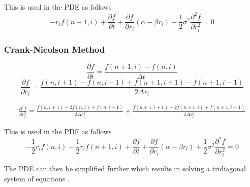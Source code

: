 \documentclass[12pt,a4paper]{article}
\begin{document}
	This is used in the PDE as follows
	$$-r_i f(n+1,i)  + \frac{\partial f}{\partial t} + \frac{\partial f}{\partial r_i}(\alpha - \beta r_i) +\frac{1}{2} \sigma^2 \frac{\partial^2 f}{\partial r_i^2}  = 0 $$
	\subsubsection{Crank-Nicolson Method}
	\label{subsubsec: Crank Method}
	
	$$\frac{\partial f}{\partial t} = \frac{f(n+1,i) - f(n,i)}{\Delta t}$$
	$$\frac{\partial f}{\partial r_i} = \frac{f(n,i+1) - f(n,i-1) +f(n+1,i+1) -f(n+1,i-1)}{2 \Delta r_i}$$
	
	\begin{gather*}
	\frac{\partial^2 f}{\partial r_i^2} = \frac{f(n,i+1) - 2f(n,i) + f(n,i-1)}{2\Delta r_i^2}
	+ \frac{f(n+1,i+1) - 2f(n+1,i) +f(n+1,i-1)}{2\Delta r_i^2}
	\end{gather*}
	
	This is used in the PDE as follows
	$$-\frac{1}{2}r_i f(n,i)-\frac{1}{2} r_i f(n+1,i) + \frac{\partial f}{\partial t} + \frac{\partial f}{\partial r_i}(\alpha - \beta r_i) +\frac{1}{2} \sigma^2 \frac{\partial^2 f}{\partial r_i^2}  = 0 $$
	
	The PDE can then be simplified further which results in solving a tridiagonal system of equations \citep{Cairns}.
		
		
\end{document}
